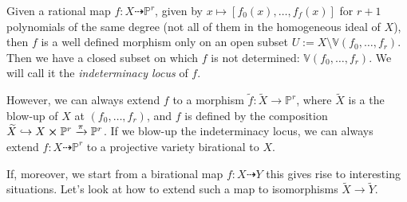 \begin{rem}
	Given a rational map $f: X \dashrightarrow \mathbb{P}^{r}$, given by
	$x \mapsto \left[ f_0(x) , \ldots , f_f(x) \right]$ for $r+1$ polynomials of the same degree
	(not all of them in the homogeneous ideal of $X$), then
	$f$ is a well defined morphism only on an open subset
	$U := X \setminus \mathbb{V}\left( f_0, \ldots, f_r \right)$.
	Then we have a closed subset on which $f$ is not determined: $\mathbb{V}\left( f_0, \ldots, f_r \right)$.
	We will call it the \textit{indeterminacy locus} of $f$.

	However, we can always extend $f$ to a morphism $\tilde{f}: \widetilde{X} \to \mathbb{P}^{r}$, 
	where $\widetilde{X}$ is a the blow-up of $X$ at $\left( f_0, \ldots, f_r \right)$, and
	$f$ is defined by the composition $\widetilde{X} \hookrightarrow X \cross \mathbb{P}^{r} \xrightarrow{\pi} \mathbb{P}^{r}$.
	If we blow-up the indeterminacy locus, we can always extend $f: X \dashrightarrow \mathbb{P}^{r}$
	to a projective variety birational to $X$.
	
	If, moreover, we start from a birational map $f: X \dashrightarrow Y$ this gives rise to interesting situations.
	Let's look at how to extend such a map to isomorphisms $\widetilde{X} \to \widetilde{Y}$.
\end{rem} 


